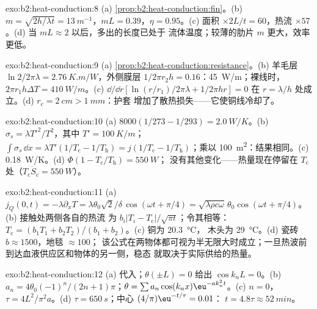 \begin{solution}{exo:b2:heat-conduction:8}
(a) \cref{prop:b2:heat-conduction:fin}。(b) $m = \sqrt{2h/\lambda t} =
\qty{13}{m^{-1}}$，$mL = 0.39$，$\eta = 0.95$。(c) 面积 $\times 2L/t = 60$，热流
$\times 57$。(d) 当 $mL \approx 2$ 以后，多出的长度已处于
流体温度；较薄的肋片 $m$ 更大，效率更低。
\end{solution}

\begin{solution}{exo:b2:heat-conduction:9}
(a) \cref{prop:b2:heat-conduction:resistance}。(b) 羊毛层 $\ln 2/2\pi\lambda =
\qty{2.76}{K.m/W}$，外侧膜层 $1/2\pi r_2h = 0.16$：\qty{45}{W/m}；裸线时，
$2\pi r_1h\Delta T = \qty{410}{W/m}$。(c) $\dd/\dd r[\ln(r/r_1)/2\pi\lambda + 1/2\pi hr]
= 0$ 在 $r = \lambda/h$ 处成立。(d) $r_{\text{c}} = \qty{2}{cm} > \qty{1}{mm}$：护套
增加了散热损失——它使铜线冷却了。
\end{solution}

\begin{solution}{exo:b2:heat-conduction:10}
(a) $8000(1/273 - 1/293) = \qty{2.0}{W/K}$。(b) $\sigma_s = \lambda T'^2/T^2$，其中
$T' = \qty{100}{K/m}$；$\int\sigma_s\,\dd x = \lambda T'(1/T_{\text{c}} - 1/T_{\text{h}})
= j(1/T_{\text{c}} - 1/T_{\text{h}})$；乘以 \qty{100}{m^2}：结果相同。(c)
\qty{0.18}{W/K}。(d) $\Phi(1 - T_{\text{c}}/T_{\text{h}}) = \qty{550}{W}$；
没有其他变化——热量现在停留在 $T_{\text{c}}$ 处（$T_{\text{c}}\dot S_{\text{c}} = \qty{550}{W}$）。
\end{solution}

\begin{solution}{exo:b2:heat-conduction:11}
(a) $j_Q(0,t) = -\lambda\partial_xT = \lambda\theta_0\sqrt2/\delta\,\cos(\omega t +
\pi/4) = \sqrt{\lambda\rho c\omega}\,\theta_0\cos(\omega t + \pi/4)$。(b) 接触处两侧各自的热流
为 $b_i|T_i - T_{\text{c}}|/\sqrt{\pi t}$；令其相等：
$T_{\text{c}} = (b_1T_1 + b_2T_2)/(b_1 + b_2)$。(c) 铜为 \qty{20.3}{\celsius}，
木头为 \qty{29}{\celsius}。(d) 瓷砖 $b \approx 1500$，地毯 $\approx 100$；
该公式在两物体都可视为半无限大时成立；一旦热波前
到达血液供应区和物体的另一侧，稳态
就取决于实际供给的热量。
\end{solution}

\begin{solution}{exo:b2:heat-conduction:12}
(a) 代入；$\theta(\pm L) = 0$ 给出 $\cos k_nL = 0$。(b) $a_n =
4\theta_0(-1)^n/(2n+1)\pi$；$\theta = \sum a_n\cos(k_nx)\eu^{-ak_n^2t}$。(c) $n = 0$，
$\tau = 4L^2/\pi^2a$。(d) $\tau = \qty{650}{s}$；中心 $(4/\pi)\eu^{-t/\tau} = 0.01$：
$t = 4.8\tau \approx \qty{52}{min}$。
\end{solution}

